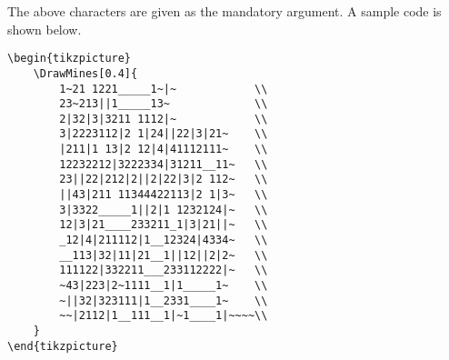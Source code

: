 \documentclass[a4paper,11pt]{article}
\begin{document}
\newpage


The above characters are given as the mandatory argument. A sample code is shown below.


\begin{lstlisting}
\begin{tikzpicture}
    \DrawMines[0.4]{
        1~21 1221_____1~|~            \\
        23~213||1_____13~             \\
        2|32|3|3211 1112|~            \\
        3|2223112|2 1|24||22|3|21~    \\
        |211|1 13|2 12|4|41112111~    \\
        12232212|3222334|31211__11~   \\
        23||22|212|2||2|22|3|2 112~   \\
        ||43|211 11344422113|2 1|3~   \\
        3|3322_____1||2|1 1232124|~   \\
        12|3|21____233211_1|3|21||~   \\
        _12|4|211112|1__12324|4334~   \\
        __113|32|11|21__1||12||2|2~   \\
        111122|332211___233112222|~   \\
        ~43|223|2~1111__1|1_____1~    \\
        ~||32|323111|1__2331____1~    \\
        ~~|2112|1__111__1|~1____1|~~~~\\
    }
\end{tikzpicture}
\end{lstlisting}
\end{document}

